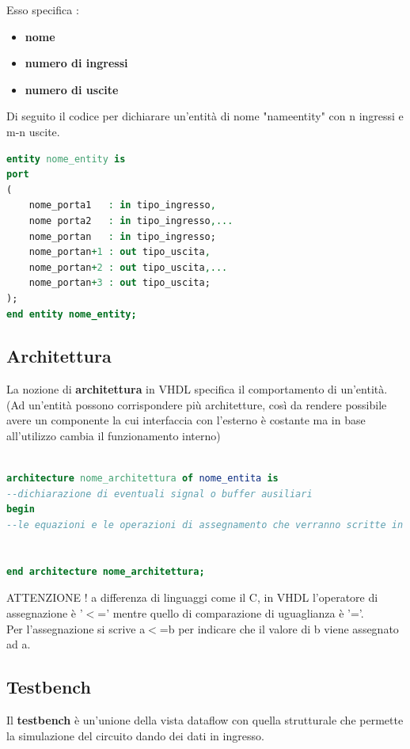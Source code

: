 \documentclass[a4paper]{book}
\begin{document}
Esso specifica :
\begin{itemize}
\item \textbf{nome}
\item \textbf{numero di ingressi}
\item \textbf{numero di uscite}
\end{itemize}
Di seguito il codice per dichiarare un'entità di nome "name\textunderscore entity" con n ingressi e m-n uscite.

\begin{lstlisting}[language=VHDL]
entity nome_entity is
port
(	
	nome_porta1   : in tipo_ingresso,
	nome porta2   : in tipo_ingresso,...
	nome_portan   : in tipo_ingresso;
	nome_portan+1 : out tipo_uscita,
	nome_portan+2 : out tipo_uscita,...
	nome_portan+3 : out tipo_uscita;
);
end entity nome_entity;
\end{lstlisting}

\subsection{Architettura}

La nozione di \textbf{architettura} in VHDL specifica il comportamento di un'entità.
(Ad un'entità possono corrispondere più architetture, così da rendere possibile avere un componente la cui interfaccia con l'esterno è costante ma in base all'utilizzo cambia il funzionamento interno)

\begin{lstlisting}[language=VHDL]

architecture nome_architettura of nome_entita is
--dichiarazione di eventuali signal o buffer ausiliari
begin
--le equazioni e le operazioni di assegnamento che verranno scritte in questa zona verranno eseguite tutte in contemporanea, indipendentemente dalla sequenza in cui compariranno


end architecture nome_architettura;
\end{lstlisting}
ATTENZIONE ! a differenza di linguaggi come il C, in VHDL l'operatore di assegnazione è '$<$=' mentre quello di comparazione di uguaglianza è '='.\\
Per l'assegnazione si scrive a$<$=b per indicare che il valore di b viene assegnato ad a.

\subsection{Testbench}

Il \textbf{testbench} è un'unione della vista dataflow con quella strutturale che permette la simulazione del circuito dando dei dati in ingresso.
\end{document}
